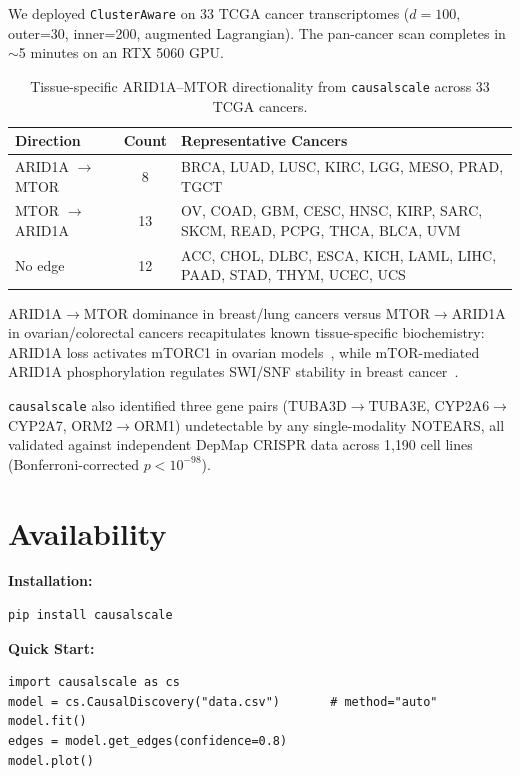 \documentclass[11pt,twoside]{article}
\begin{document}
We deployed \texttt{ClusterAware} on 33 TCGA cancer transcriptomes ($d=100$,
outer=30, inner=200, augmented Lagrangian). The pan-cancer scan completes in
$\sim$5 minutes on an RTX 5060 GPU.

\begin{table}[htbp]
\small
\centering
\caption{Tissue-specific ARID1A--MTOR directionality from \texttt{causalscale}
across 33 TCGA cancers.}
\label{tab:arid1a}
\begin{tabular}{lcl}
\toprule
Direction & Count & Representative Cancers \\
\midrule
ARID1A $\rightarrow$ MTOR & 8  & BRCA, LUAD, LUSC, KIRC, LGG, MESO, PRAD, TGCT \\
MTOR $\rightarrow$ ARID1A & 13 & OV, COAD, GBM, CESC, HNSC, KIRP, SARC, SKCM, READ, PCPG, THCA, BLCA, UVM \\
No edge                   & 12 & ACC, CHOL, DLBC, ESCA, KICH, LAML, LIHC, PAAD, STAD, THYM, UCEC, UCS \\
\bottomrule
\end{tabular}
\end{table}

ARID1A$\rightarrow$MTOR dominance in breast/lung cancers versus
MTOR$\rightarrow$ARID1A in ovarian/colorectal cancers recapitulates known
tissue-specific biochemistry: ARID1A loss activates mTORC1 in ovarian
models~\citep{chandler2015coexistent}, while mTOR-mediated ARID1A phosphorylation
regulates SWI/SNF stability in breast cancer~\citep{zhang2023mTOR}.

\texttt{causalscale} also identified three gene pairs (TUBA3D$\rightarrow$TUBA3E,
CYP2A6$\rightarrow$CYP2A7, ORM2$\rightarrow$ORM1) undetectable by any single-modality
NOTEARS, all validated against independent DepMap CRISPR data across 1{,}190 cell
lines (Bonferroni-corrected $p<10^{-98}$).

\section{Availability}

\noindent\textbf{Installation:}
\begin{verbatim}
pip install causalscale
\end{verbatim}

\noindent\textbf{Quick Start:}
\begin{verbatim}
import causalscale as cs
model = cs.CausalDiscovery("data.csv")       # method="auto"
model.fit()
edges = model.get_edges(confidence=0.8)
model.plot()
\end{verbatim}
\end{document}
